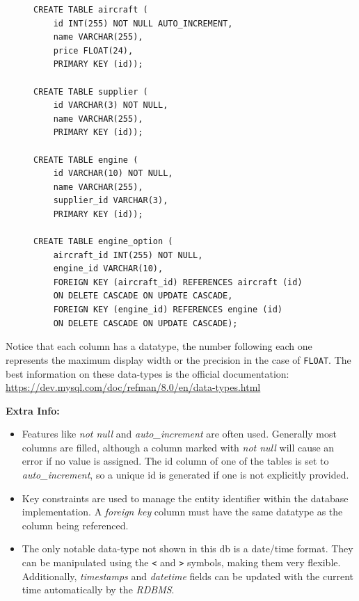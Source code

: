 \documentclass[10pt]{article}
\begin{document}
\begin{figure}[H]
\begin{verbatim}
CREATE TABLE aircraft (
    id INT(255) NOT NULL AUTO_INCREMENT,
    name VARCHAR(255),
    price FLOAT(24),
    PRIMARY KEY (id));

CREATE TABLE supplier (
    id VARCHAR(3) NOT NULL,
    name VARCHAR(255),
    PRIMARY KEY (id));

CREATE TABLE engine (
    id VARCHAR(10) NOT NULL,
    name VARCHAR(255),
    supplier_id VARCHAR(3),
    PRIMARY KEY (id));

CREATE TABLE engine_option (
    aircraft_id INT(255) NOT NULL,
    engine_id VARCHAR(10),
    FOREIGN KEY (aircraft_id) REFERENCES aircraft (id)
    ON DELETE CASCADE ON UPDATE CASCADE,
    FOREIGN KEY (engine_id) REFERENCES engine (id)
    ON DELETE CASCADE ON UPDATE CASCADE);
\end{verbatim}
\end{figure}

Notice that each column has a datatype, the number following each one represents the maximum display width or the precision in the case of \texttt{FLOAT}. The best information on these data-types is the official documentation: \url{https://dev.mysql.com/doc/refman/8.0/en/data-types.html}

\textbf{Extra Info:}

\begin{itemize}
\item Features like \emph{not null} and \emph{auto\_increment} are often used. Generally most columns are filled, although a column marked with \emph{not null} will cause an error if no value is assigned. The id column of one of the tables is set to \emph{auto\_increment}, so a unique id is generated if one is not explicitly provided.
\item Key constraints are used to manage the entity identifier within the database implementation. A \emph{foreign key} column must have the same datatype as the column being referenced.
\item The only notable data-type not shown in this db is a date/time format. They can be manipulated using the \texttt{<} and \texttt{>} symbols, making them very flexible. Additionally, \emph{timestamps} and \emph{datetime} fields can be updated with the current time automatically by the \emph{RDBMS}.
\end{itemize}
\end{document}
